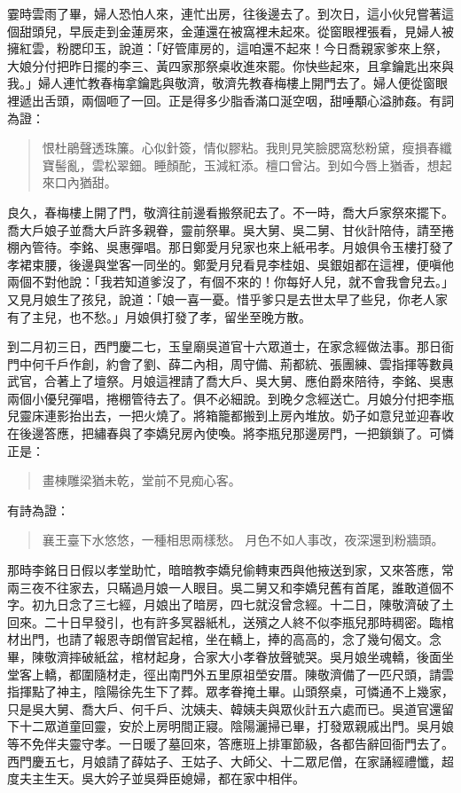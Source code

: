 霎時雲雨了畢，婦人恐怕人來，連忙出房，往後邊去了。到次日，這小伙兒嘗著這個甜頭兒，早辰走到金蓮房來，金蓮還在被窩裡未起來。從窗眼裡張看，見婦人被擁紅雲，粉腮印玉，說道：「好管庫房的，這咱還不起來！今日喬親家爹來上祭，大娘分付把昨日擺的李三、黃四家那祭桌收進來罷。你快些起來，且拿鑰匙出來與我。」婦人連忙教春梅拿鑰匙與敬濟，敬濟先教春梅樓上開門去了。婦人便從窗眼裡遞出舌頭，兩個咂了一回。正是得多少脂香滿口涎空咽，甜唾顒心溢肺姦。有詞為證：
\begin{quote}
恨杜鵑聲透珠簾。心似針簽，情似膠粘。我則見笑臉腮窩愁粉黛，瘦損春纖寶髻亂，雲松翠鈿。睡顏酡，玉減紅添。檀口曾沾。到如今唇上猶香，想起來口內猶甜。
\end{quote}

良久，春梅樓上開了門，敬濟往前邊看搬祭祀去了。不一時，喬大戶家祭來擺下。喬大戶娘子並喬大戶許多親眷，靈前祭畢。吳大舅、吳二舅、甘伙計陪侍，請至捲棚內管待。李銘、吳惠彈唱。那日鄭愛月兒家也來上紙弔孝。月娘俱令玉樓打發了孝裙束腰，後邊與堂客一同坐的。鄭愛月兒看見李桂姐、吳銀姐都在這裡，便嗔他兩個不對他說：「我若知道爹沒了，有個不來的！你每好人兒，就不會我會兒去。」又見月娘生了孩兒，說道：「娘一喜一憂。惜乎爹只是去世太早了些兒，你老人家有了主兒，也不愁。」月娘俱打發了孝，留坐至晚方散。

到二月初三日，西門慶二七，玉皇廟吳道官十六眾道士，在家念經做法事。那日衙門中何千戶作創，約會了劉、薛二內相，周守備、荊都統、張團練、雲指揮等數員武官，合著上了壇祭。月娘這裡請了喬大戶、吳大舅、應伯爵來陪待，李銘、吳惠兩個小優兒彈唱，捲棚管待去了。俱不必細說。到晚夕念經送亡。月娘分付把李瓶兒靈床連影抬出去，一把火燒了。將箱籠都搬到上房內堆放。奶子如意兒並迎春收在後邊答應，把繡春與了李嬌兒房內使喚。將李瓶兒那邊房門，一把鎖鎖了。可憐正是：
\begin{quote}
畫棟雕梁猶未乾，堂前不見痴心客。
\end{quote}
有詩為證：
\begin{quote}
襄王臺下水悠悠，一種相思兩樣愁。
月色不如人事改，夜深還到粉牆頭。
\end{quote}

那時李銘日日假以孝堂助忙，暗暗教李嬌兒偷轉東西與他掖送到家，又來答應，常兩三夜不往家去，只瞞過月娘一人眼目。吳二舅又和李嬌兒舊有首尾，誰敢道個不字。初九日念了三七經，月娘出了暗房，四七就沒曾念經。十二日，陳敬濟破了土回來。二十日早發引，也有許多冥器紙札，送殯之人終不似李瓶兒那時稠密。臨棺材出門，也請了報恩寺朗僧官起棺，坐在轎上，捧的高高的，念了幾句偈文。念畢，陳敬濟摔破紙盆，棺材起身，合家大小孝眷放聲號哭。吳月娘坐魂轎，後面坐堂客上轎，都圍隨材走，徑出南門外五里原祖塋安厝。陳敬濟備了一匹尺頭，請雲指揮點了神主，陰陽徐先生下了葬。眾孝眷掩土畢。山頭祭桌，可憐通不上幾家，只是吳大舅、喬大戶、何千戶、沈姨夫、韓姨夫與眾伙計五六處而已。吳道官還留下十二眾道童回靈，安於上房明間正寢。陰陽灑掃已畢，打發眾親戚出門。吳月娘等不免伴夫靈守孝。一日暖了墓回來，答應班上排軍節級，各都告辭回衙門去了。西門慶五七，月娘請了薛姑子、王姑子、大師父、十二眾尼僧，在家誦經禮懺，超度夫主生天。吳大妗子並吳舜臣媳婦，都在家中相伴。

